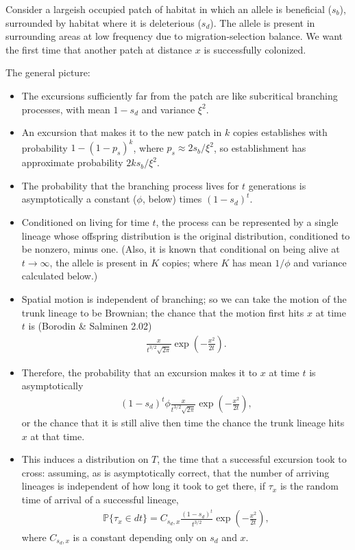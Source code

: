 \documentclass{article}
\renewcommand{\P}{\mathbb{P}}
\begin{document}
Consider a largeish occupied patch of habitat in which an allele is beneficial ($s_b$),
surrounded by habitat where it is deleterious ($s_d$).
The allele is present in surrounding areas at low frequency due to migration-selection balance.
We want the first time that another patch at distance $x$ is successfully colonized.

The general picture:
\begin{itemize}

\item The excursions sufficiently far from the patch are like subcritical branching processes,
with mean $1-s_d$ and variance $\xi^2$.

\item An excursion that makes it to the new patch in $k$ copies establishes with probability $1-(1-p_s)^k$,
where $p_s \approx 2s_b/\xi^2$, so establishment has approximate probability $2 k s_b / \xi^2$.

\item The probability that the branching process lives for $t$ generations is asymptotically a constant ($\phi$, below) times $(1-s_d)^t$.

\item Conditioned on living for time $t$, the process can be represented by a single lineage whose offspring distribution
is the original distribution, conditioned to be nonzero, minus one.
(Also, it is known that conditional on being alive at $t\to\infty$, the allele is present in $K$ copies; where $K$ has mean $1/\phi$ and variance calculated below.)

\item Spatial motion is independent of branching;
so we can take the motion of the trunk lineage to be Brownian;
the chance that the motion first hits $x$ at time $t$ is (Borodin \& Salminen 2.02)
\begin{align}
\frac{x}{t^{3/2}\sqrt{2\pi}} \exp\left(-\frac{x^2}{2t}\right) .
\end{align}

\item Therefore, the probability that an excursion makes it to $x$ at time $t$ is asymptotically
\begin{align}
  (1-s_d)^t \phi \frac{x}{t^{3/2}\sqrt{2\pi}} \exp\left(-\frac{x^2}{2t}\right) ,
\end{align}
or the chance that it is still alive then time the chance the trunk lineage hits $x$ at that time.

\item This induces a distribution on $T$, the time that a successful excursion took to cross:
assuming, as is asymptotically correct, that the number of arriving lineages is independent of how long it took to get there,
if $\tau_x$ is the random time of arrival of a successful lineage,
\begin{align}
 \P\{\tau_x \in dt\} = C_{s_d,x} \frac{(1-s_d)^t}{t^{3/2}} \exp\left(-\frac{x^2}{2t}\right) ,
\end{align}
where $C_{s_d,x}$ is a constant depending only on $s_d$ and $x$.



\end{itemize}
\end{document}
